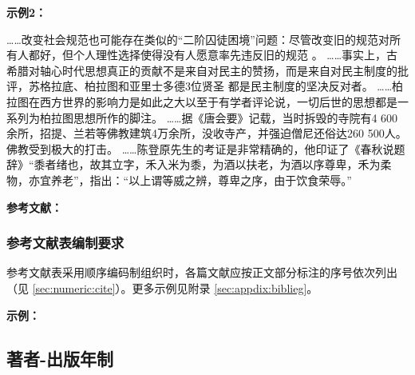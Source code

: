 \documentclass[twoside]{article}%
\begin{document}
\begin{refsection}
\small
\textbf{示例2：}

\renewcommand{\thempfootnote}{\arabic{mpfootnote}}
\smallskip\noindent\begin{minipage}{\textwidth}\renewcommand{\thempfootnote}{\arabic{mpfootnote}}
\let\footnoterule\relax%
%
\hspace{2em}……改变社会规范也可能存在类似的“二阶囚徒困境”问题：尽管改变旧的规范对所有人都好，但个人理性选择使得没有人愿意率先违反旧的规范
。
……事实上，古希腊对轴心时代思想真正的贡献不是来自对民主的赞扬，而是来自对民主制度的批评，苏格拉底、柏拉图和亚里士多德3位贤圣
都是民主制度的坚决反对者。
……柏拉图在西方世界的影响力是如此之大以至于有学者评论说，一切后世的思想都是一系列为柏拉图思想所作的脚注。
……据《唐会要》记载，当时拆毁的寺院有4 600余所，招提、兰若等佛教建筑4万余所，没收寺产，并强迫僧尼还俗达260 500人。
佛教受到极大的打击。
……陈登原先生的考证是非常精确的，他印证了《春秋说题辞》“黍者绪也，故其立字，禾入米为黍，为酒以扶老，为酒以序尊卑，禾为柔物，亦宜养老”，指出：“以上谓等威之辨，尊卑之序，由于饮食荣辱。”

\hspace{2em}\textbf{参考文献：}\vspace{-2mm}
\end{minipage}
\end{refsection}

\subsubsection{参考文献表编制要求}

参考文献表采用顺序编码制组织时，各篇文献应按正文部分标注的序号依次列出（见 \ref{sec:numeric:cite}）。更多示例见附录 \ref{sec:appdix:biblieg}。

\begin{refsection}
\mbox{}{\small\textbf{示例：}\par}

\nocite{Baker1995--,Chernik1982--,尼葛洛庞帝1996--,汪冰1997-16-16,杨宗英1996-24-29,Dowler1995-5-26}

\printbibliography[heading=none,env=indentegenv]
\end{refsection}


\subsection{著者-出版年制}\label{sec:ay:ay}
\end{document}
